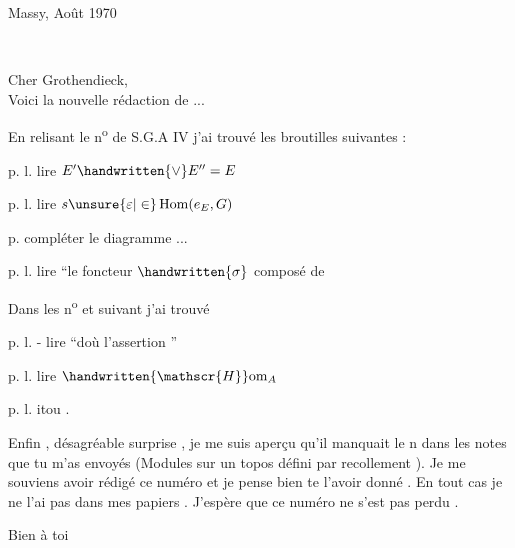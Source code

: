 \begin{flushright}
Massy, Août 1970\\
\end{flushright}

\begin{flushright}
\\
\end{flushright}
Cher Grothendieck,\\

Voici la nouvelle rédaction de ...

En relisant le n\textsuperscript{o}  de S.G.A  IV j'ai trouvé les broutilles suivantes :

p.  l.  lire \(E'\handwritten{\vee} E'' = E\)

p.  l.  lire \(s\unsure{\varepsilon|\in}\operatorname{Hom}(e_E,G)\)

p.  compléter le diagramme ...

p.  l.  lire ``le foncteur \(\handwritten{\sigma}\) composé de

Dans les n\textsuperscript{o}  et suivant j'ai trouvé

p.  l. - lire ``doù l'assertion ''

p.  l.  lire \(\handwritten{\mathscr{H}}\mathrm{om}_A\)

p. l.  itou .

Enfin , désagréable surprise , je me suis aperçu qu'il manquait le n  dans les notes que tu m'as envoyés (Modules sur un topos défini par recollement ). Je me souviens avoir rédigé ce numéro et je pense bien te l'avoir donné . En tout cas je ne l'ai pas dans mes papiers . J'espère que ce numéro ne s'est pas perdu .

\begin{flushright}
Bien à toi\\
\\
\end{flushright}

